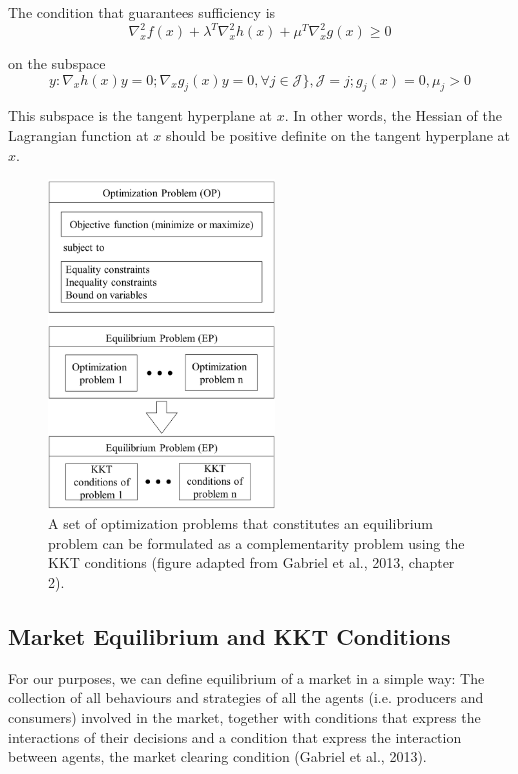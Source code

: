 \documentclass[11pt, letterpaper]{article}
\begin{document}
The condition that guarantees sufficiency is 
\begin{equation}
    \nabla^{2}_{x} f(x) + \lambda^{T} \nabla^{2}_{x} h(x) + \mu^{T} \nabla^{2}_{x} g(x) \geq 0
\end{equation}

on the subspace
\begin{equation}
    y: \nabla_{x} h(x) y =0; \nabla_{x} g_j(x) y =0, \forall j \in \mathcal{J}\}, \mathcal{J} = j; g_{j}(x) = 0, \mu_{j} > 0
\end{equation}


This subspace is the tangent hyperplane at $x$. In other words, the Hessian of the Lagrangian function at $x$ should be positive definite on the tangent hyperplane at $x$.

\begin{figure}[ht!]
  \begin{center}
    \includegraphics[width=6cm]{EP.png}
  \end{center}
 \caption{A set of optimization problems that constitutes an equilibrium problem can be formulated as a complementarity problem using the KKT conditions (figure adapted from Gabriel et al., 2013, chapter 2). }
 \label{opt-eq}
\end{figure}

\subsection{Market Equilibrium and KKT Conditions}

For our purposes, we can define equilibrium of a market in a simple way: The collection of all behaviours and strategies of all the agents (i.e. producers and consumers) involved in the market, together with conditions that express the interactions of their decisions and a condition that express the interaction between agents, the market clearing condition (Gabriel et al., 2013). 
\smallskip
\end{document}
